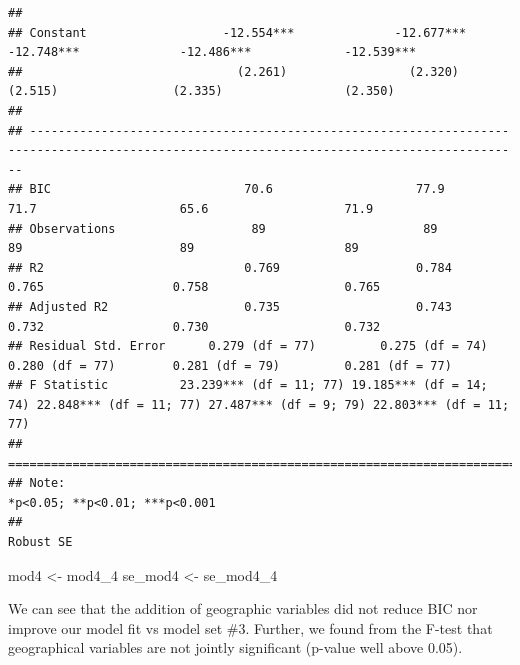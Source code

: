 \documentclass[]{article}
\newenvironment{Shaded}{\begin{snugshade}}{\end{snugshade}}
\newcommand{\DecValTok}[1]{\textcolor[rgb]{0.00,0.00,0.81}{#1}}
\newcommand{\NormalTok}[1]{#1}
\newcommand{\StringTok}[1]{\textcolor[rgb]{0.31,0.60,0.02}{#1}}
\begin{document}
\begin{verbatim}
##                                                                                                                                            
## Constant                   -12.554***              -12.677***              -12.748***              -12.486***             -12.539***       
##                              (2.261)                 (2.320)                 (2.515)                (2.335)                 (2.350)        
##                                                                                                                                            
## -------------------------------------------------------------------------------------------------------------------------------------------
## BIC                           70.6                    77.9                    71.7                    65.6                   71.9          
## Observations                   89                      89                      89                      89                     89           
## R2                            0.769                   0.784                   0.765                  0.758                   0.765         
## Adjusted R2                   0.735                   0.743                   0.732                  0.730                   0.732         
## Residual Std. Error      0.279 (df = 77)         0.275 (df = 74)         0.280 (df = 77)        0.281 (df = 79)         0.281 (df = 77)    
## F Statistic          23.239*** (df = 11; 77) 19.185*** (df = 14; 74) 22.848*** (df = 11; 77) 27.487*** (df = 9; 79) 22.803*** (df = 11; 77)
## ===========================================================================================================================================
## Note:                                                                                                         *p<0.05; **p<0.01; ***p<0.001
##                                                                                                                                   Robust SE
\end{verbatim}

\begin{Shaded}
\begin{Highlighting}[]
\NormalTok{mod4 <-}\StringTok{ }\NormalTok{mod4_}\DecValTok{4}
\NormalTok{se_mod4 <-}\StringTok{ }\NormalTok{se_mod4_}\DecValTok{4}
\end{Highlighting}
\end{Shaded}

We can see that the addition of geographic variables did not reduce BIC
nor improve our model fit vs model set \#3. Further, we found from the
F-test that geographical variables are not jointly significant (p-value
well above 0.05).
\end{document}
